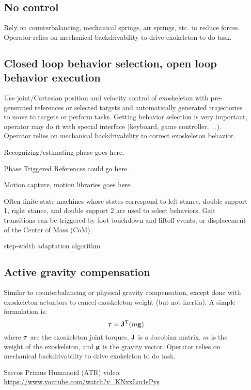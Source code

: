 \documentclass[letterpaper,12pt,fullpage]{article}
\begin{document}
\subsection{No control}

Rely on counterbalancing, mechanical springs, air springs, etc.
to reduce forces. 
Operator relies on mechanical backdrivability to drive
exokeleton to do task.

\subsection{Closed loop behavior selection, open loop behavior
execution}

Use joint/Cartesian position and velocity control of exoskeleton 
with pre-generated references or selected targets and automatically generated trajectories to move to targets or perform tasks.
Getting behavior selection is very important, operator may do it with
special interface (keyboard, game controller, ...).
Operator relies on mechanical backdrivability to correct exoskeleton behavior.

Recognizing/estimating phase goes here.

Phase Triggered References could go here.

Motion capture, motion libraries goes here.

Often finite state machines whose states correspond to left stance, double support 1,
right stance, and double support 2 are used to select behaviors. Gait transitions
can be triggered by foot touchdown and liftoff events, or
displacement of the Center of Mass (CoM).

step-width adaptation algorithm

\subsection{Active gravity compensation}

Similar to counterbalancing or physical gravity compensation, except done
with exoskeleton actuators to cancel exoskeleton weight (but not inertia).
A simple formulation is:
\begin{equation}
\vtau = \mJ^{\tr} (m\vg)
\end{equation}
where $\vtau$ are the exoskeleton joint torques, 
${\bf J}$ is a Jacobian matrix, $m$ is the weight of the exoskeleton,
and ${\bf g}$ is the gravity vector. 
Operator relies on mechanical backdrivability to drive
exokeleton to do task.

Sarcos Primus Humanoid (ATR) video:\\
\url{https://www.youtube.com/watch?v=KNxxLm4sPys}
\end{document}
